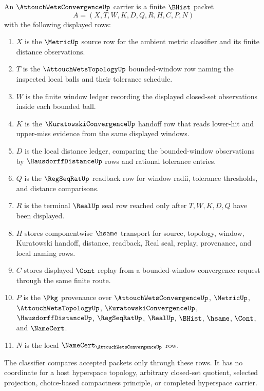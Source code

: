 \begin{definition}
\label{def:attouch-wets-convergence-carrier}
An $\AttouchWetsConvergenceUp$ carrier is a finite $\BHist$ packet
$$
A=(X,T,W,K,D,Q,R,H,C,P,N)
$$
with the following displayed rows:
\begin{enumerate}
\item $X$ is the $\MetricUp$ source row for the ambient metric classifier and its finite distance observations.
\item $T$ is the $\AttouchWetsTopologyUp$ bounded-window row naming the inspected local balls and their tolerance schedule.
\item $W$ is the finite window ledger recording the displayed closed-set observations inside each bounded ball.
\item $K$ is the $\KuratowskiConvergenceUp$ handoff row that reads lower-hit and upper-miss evidence from the same displayed windows.
\item $D$ is the local distance ledger, comparing the bounded-window observations by $\HausdorffDistanceUp$ rows and rational tolerance entries.
\item $Q$ is the $\RegSeqRatUp$ readback row for window radii, tolerance thresholds, and distance comparisons.
\item $R$ is the terminal $\RealUp$ seal row reached only after $T,W,K,D,Q$ have been displayed.
\item $H$ stores componentwise $\hsame$ transport for source, topology, window, Kuratowski handoff, distance, readback, Real seal, replay, provenance, and local naming rows.
\item $C$ stores displayed $\Cont$ replay from a bounded-window convergence request through the same finite route.
\item $P$ is the $\Pkg$ provenance over $\AttouchWetsConvergenceUp$, $\MetricUp$, $\AttouchWetsTopologyUp$, $\KuratowskiConvergenceUp$, $\HausdorffDistanceUp$, $\RegSeqRatUp$, $\RealUp$, $\BHist$, $\hsame$, $\Cont$, and $\NameCert$.
\item $N$ is the local $\NameCert_{\AttouchWetsConvergenceUp}$ row.
\end{enumerate}
The classifier compares accepted packets only through these rows. It has no coordinate for a host hyperspace topology, arbitrary closed-set quotient, selected projection, choice-based compactness principle, or completed hyperspace carrier.
\end{definition}

